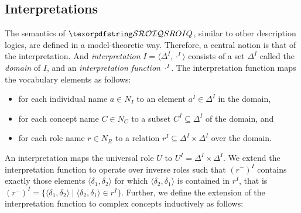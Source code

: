 \subsection{Interpretations} \label{interpretations}

The semantics of $\SROIQ$, similar to other description logics, are defined in a model-theoretic way. Therefore, a central notion is that of the interpretation. And \emph{interpretation} $I = \langle \Delta^I, \cdot^I \rangle$ consists of a set $\Delta^I$ called the \emph{domain} of $I$, and an \emph{interpretation function} $\cdot^I$. The interpretation function maps the vocabulary elements as follows:
\begin{itemize}
  \item for each individual name $a \in N_I$ to an element $a^I \in \Delta^I$ in the domain,
  \item for each concept name $C \in N_C$ to a subset $C^I \subseteq \Delta^I$ of the domain, and
  \item for each role name $r \in N_R$ to a relation $r^I \subseteq \Delta^I \times \Delta^I$ over the domain.
\end{itemize}
An interpretation maps the universal role $U$ to $U^I = \Delta^I \times \Delta^I$. We extend the interpretation function to operate over inverse roles such that  $\left(r^-\right)^I$ contains exactly those elements $\langle \delta_1, \delta_2 \rangle$ for which $\langle \delta_2, \delta_1 \rangle$ is contained in $r^I$, that is  $\left(r^-\right)^I = \{ \langle \delta_1, \delta_2 \rangle \mid \langle \delta_2, \delta_1 \rangle \in r^I \}$. Further, we define the extension of the interpretation function to complex concepts inductively as follows:
